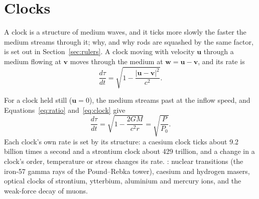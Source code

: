 \documentclass[11pt,a4paper]{article}
\begin{document}
\section{Clocks}
\label{sec:clocks}

\begin{hypbar}
A clock is a structure of medium waves, and it ticks more slowly the faster the medium streams through it; why, and why rods are squashed by the same factor, is set out in Section~\ref{sec:rulers}. A clock moving with velocity $\mathbf{u}$ through a medium flowing at $\mathbf{v}$ moves through the medium at $\mathbf{w} = \mathbf{u} - \mathbf{v}$, and its rate is
\begin{equation}
\frac{d\tau}{dt} = \sqrt{1 - \frac{|\mathbf{u}-\mathbf{v}|^2}{c^2}}.
\label{eq:clock}
\end{equation}
\end{hypbar}

For a clock held still ($\mathbf{u}=0$), the medium streams past at the inflow speed, and Equations~\eqref{eq:ratio} and~\eqref{eq:clock} give
\begin{equation}
\frac{d\tau}{dt} = \sqrt{1 - \frac{2GM}{c^2 r}} = \sqrt{\frac{P}{P_0}}.
\end{equation}
 Each clock's own rate is set by its structure: a caesium clock ticks about 9.2 billion times a second and a strontium clock about 429 trillion, and a change in a clock's order, temperature or stress changes its rate. : nuclear transitions (the iron-57 gamma rays of the Pound--Rebka tower), caesium and hydrogen masers, optical clocks of strontium, ytterbium, aluminium and mercury ions, and the weak-force decay of muons. 
\end{document}
